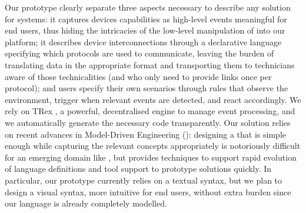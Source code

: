 Our prototype \IOTDSL clearly separate three aspects necessary to describe any solution for \IOT systems: it captures devices capabilities as high-level events meaningful for end users, thus hiding the intricacies of the low-level manipulation of \DSLS into our platform; it describes device interconnections through a declarative language specifying which protocols are used to communicate, leaving the burden of translating data in the appropriate format and transporting them to technicians aware of those technicalities (and who only need to provide links once per protocol); and users specify their own scenarios through rules that observe the environment, trigger when relevant events are detected, and react accordingly. We rely on TRex \cite{cugola-12}, a powerful, decentralised \CEP engine to manage event processing, and we automatically generate the necessary code transparently. Our solution relies on recent advances in Model-Driven Engineering (\MDE): designing a \DSL that is simple enough while capturing the relevant concepts appropriately is notoriously difficult for an emerging domain like \IOT, but \MDE provides techniques to support rapid evolution of language definitions and tool support to prototype solutions quickly. In particular, our prototype currently relies on a textual syntax, but we plan to design a visual syntax, more intuitive for end users, without extra burden since our language is already completely modelled. 

